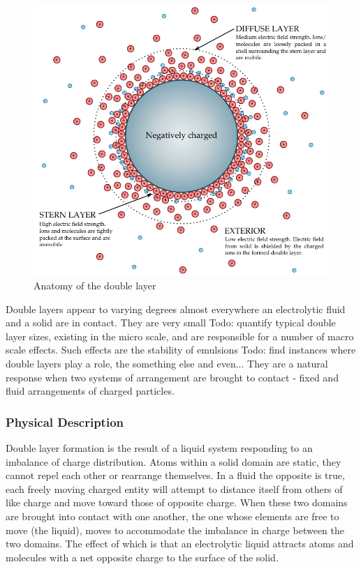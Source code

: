     \begin{figure}
      \begin{center}
        \includegraphics{content/introduction/graphics/doubleLayer_labelled.pdf}
      \end{center}
      \caption{Anatomy of the double layer}
      \label{fig:doubleLayer_anatomy}
    \end{figure}

    Double layers appear to varying degrees almost everywhere an electrolytic fluid and a solid are in contact. They are very small {Todo: quantify typical double layer sizes}, existing in the micro scale, and are responsible for a number of macro scale effects. Such effects are the stability of emulsions {Todo: find instances where double layers play a role}, the something else and even... They are a natural response when two systems of arrangement are brought to contact - fixed and fluid arrangements of charged particles.

  \subsubsection*{Physical Description}
    Double layer formation is the result of a liquid system responding to an imbalance of charge distribution. Atoms within a solid domain are static, they cannot repel each other or rearrange themselves. In a fluid the opposite is true, each freely moving charged entity will attempt to distance itself from others of like charge and move toward those of opposite charge. When these two domains are brought into contact with one another, the one whose elements are free to move (the liquid), moves to accommodate the imbalance in charge between the two domains. The effect of which is that an electrolytic liquid attracts atoms and molecules with a net opposite charge to the surface of the solid.


